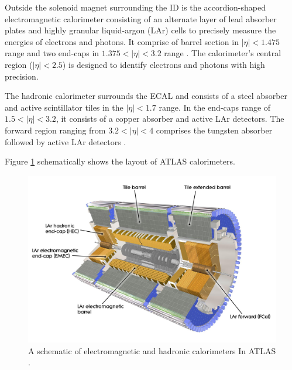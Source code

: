 Outside the solenoid magnet surrounding the ID is the accordion-shaped electromagnetic calorimeter consisting of an alternate layer of lead absorber plates and highly granular liquid-argon (LAr) cells to precisely measure the energies of electrons and photons. It comprise of barrel section in $|\eta| < 1.475$ range and two end-caps in $1.375 < |\eta| < 3.2$ range \cite{ATLAS_ECAL}. The calorimeter's central region ($|\eta| < 2.5$) is designed to identify electrons and photons with high precision.

The hadronic calorimeter surrounds the ECAL and consists of a steel absorber and active scintillator tiles in the $|\eta| < 1.7$ range. In the end-caps range of $1.5 < |\eta| < 3.2$, it consists of a copper absorber and active LAr detectors. The forward region ranging from $3.2 < |\eta| < 4$ comprises the tungsten absorber followed by active LAr detectors \cite{ATLAS_HCAL}. 

Figure \ref{fig:ATLAS_Cals} schematically shows the layout of ATLAS calorimeters. 

\begin{figure}[!htb]
    \centering
    \includegraphics[width=.98\linewidth]{figures/LHC/ATLAS_CALO.jpeg}
    \caption{ A schematic of electromagnetic and hadronic calorimeters In ATLAS \cite{ATLAS}.\label{fig:ATLAS_Cals}}
\end{figure}

